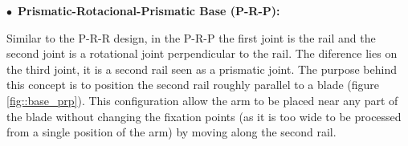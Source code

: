   
%   

$\bullet$~\textbf{Prismatic-Rotacional-Prismatic Base (P-R-P):}



  Similar to the P-R-R design, in the P-R-P the first joint is the rail and the
  second joint is a rotational joint perpendicular to the rail. The diference
  lies on the third joint, it is a second rail seen as a prismatic joint. The
  purpose behind this concept is to position the second rail roughly parallel to
  a blade (figure \ref{fig::base_prp}). This configuration  allow the arm to be
  placed near any part of the blade without changing the fixation points (as it
  is too wide to be processed from a single position of the arm) by moving along the second rail.
  

